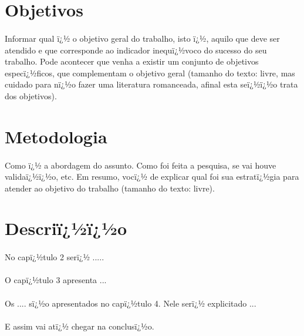 \section{Objetivos}

\paragraph{}Informar qual ï¿½ o objetivo geral do trabalho, isto ï¿½, aquilo que deve ser atendido e que corresponde ao indicador inequï¿½voco do sucesso do seu trabalho. Pode acontecer que venha a existir um conjunto de objetivos especï¿½ficos, que complementam o objetivo geral (tamanho do texto: livre, mas cuidado para nï¿½o fazer uma literatura romanceada, afinal esta seï¿½ï¿½o trata dos objetivos).


\section{Metodologia}

\paragraph{}Como ï¿½ a abordagem do assunto. Como foi feita a pesquisa, se vai houve validaï¿½ï¿½o, etc. Em resumo, vocï¿½ de explicar qual foi sua estratï¿½gia para atender ao objetivo do trabalho (tamanho do texto: livre).


\section{Descriï¿½ï¿½o}

\paragraph{}No capï¿½tulo 2 serï¿½ .....

\paragraph{}O capï¿½tulo 3 apresenta ...

\paragraph{}Os .... sï¿½o apresentados no capï¿½tulo 4. Nele serï¿½ explicitado ...

\paragraph{}E assim vai atï¿½ chegar na conclusï¿½o.
